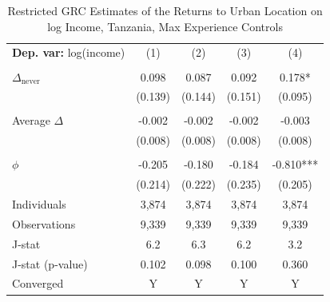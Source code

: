 \begin{table}[htbp] \centering \begin{threeparttable}
 \caption{Restricted GRC Estimates of the Returns to Urban Location on log Income, Tanzania, Max Experience Controls} 
 \label{tab:GRC_TZA_income_urban_unb_exp_max} 
\begin{tabular}{l cccc} \toprule  \textbf{Dep. var:}  log(income) 
                    &\multicolumn{1}{c}{(1)}   &\multicolumn{1}{c}{(2)}   &\multicolumn{1}{c}{(3)}   &\multicolumn{1}{c}{(4)}   \\
                    &               &               &               &               \\
\addlinespace
$\Delta_{\text{never}}$&       0.098   &       0.087   &       0.092   &       0.178*  \\
                    &     (0.139)   &     (0.144)   &     (0.151)   &     (0.095)   \\
                    &               &               &               &               \\
\addlinespace
Average $\Delta$    &      -0.002   &      -0.002   &      -0.002   &      -0.003   \\
                    &     (0.008)   &     (0.008)   &     (0.008)   &     (0.008)   \\
                    &               &               &               &               \\
\addlinespace
$\phi$              &      -0.205   &      -0.180   &      -0.184   &      -0.810***\\
                    &     (0.214)   &     (0.222)   &     (0.235)   &     (0.205)   \\
\addlinespace
Individuals         &       3,874   &       3,874   &       3,874   &       3,874   \\
Observations        &       9,339   &       9,339   &       9,339   &       9,339   \\
J-stat              &         6.2   &         6.3   &         6.2   &         3.2   \\
J-stat (p-value)    &       0.102   &       0.098   &       0.100   &       0.360   \\
Converged           &           Y   &           Y   &           Y   &           Y   \\

\end{tabular}
\end{threeparttable}
\end{table}

